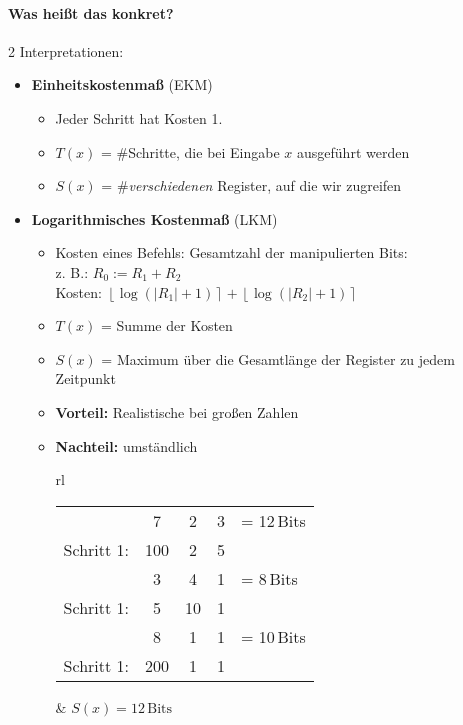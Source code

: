  \paragraph*{Was heißt das konkret?} 2 Interpretationen:
	\begin{itemize}
	 \item \textbf{Einheitskostenmaß} (EKM)
		\begin{itemize}
		\item Jeder Schritt hat Kosten 1.
		\item $T(x)$ = \#Schritte, die bei Eingabe $x$ ausgeführt werden
		\item $S(x)$ = \#\emph{verschiedenen} Register, auf die wir zugreifen
		\end{itemize}
	 \item \textbf{Logarithmisches Kostenmaß} (LKM)
		\begin{itemize}
		 \item Kosten eines Befehls: Gesamtzahl der manipulierten Bits:\\
			z. B.: $R_0 := R_1 + R_2$\\
			Kosten: $\left\lfloor\log(|R_1|+1)\right\rceil + \left\lfloor\log(|R_2|+1)\right\rceil$
		 \item $T(x)$ = Summe der Kosten
		 \item $S(x)$ = Maximum über die Gesamtlänge der Register zu jedem Zeitpunkt
		 \item \textbf{Vorteil:} Realistische bei großen Zahlen
		 \item \textbf{Nachteil:} umständlich
		 \begin{center}
		 \begin{tabular}{rl}
			\begin{minipage}{6cm}
			 \begin{tabular}{rcccl}
				& \footnotesize 7 & \footnotesize 2 & \footnotesize 3 & \footnotesize= 12\,Bits \\
				Schritt 1: & 100 & 2 & 5 & \\
				& \footnotesize 3 & \footnotesize 4 & \footnotesize 1 & \footnotesize= 8\,Bits \\
				Schritt 1: & 5 & 10 & 1 & \\
				& \footnotesize 8 & \footnotesize 1 & \footnotesize 1 &\footnotesize= 10\,Bits \\
				Schritt 1: & 200 & 1 & 1 & 
			 \end{tabular}
			\end{minipage}
		  & $S(x) = 12\,\text{Bits}$
		 \end{tabular}
		 \end{center}
		\end{itemize}
	\end{itemize}
